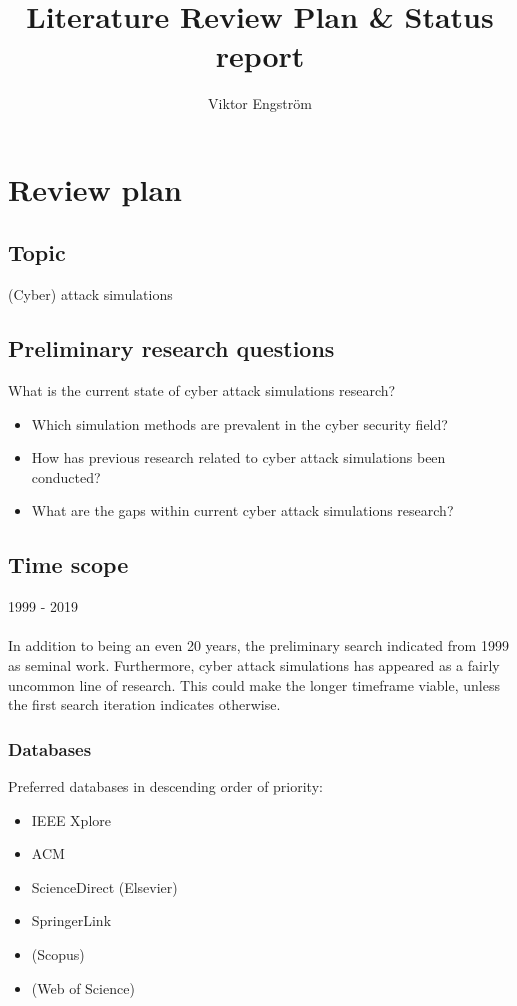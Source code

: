 \documentclass{article}
\title{Literature Review Plan \& Status report}
\author{Viktor Engström}
\begin{document}
\maketitle

\section{Review plan}
\subsection{Topic}
(Cyber) attack simulations

\subsection{Preliminary research questions}
What is the current state of cyber attack simulations research?
\begin{itemize}
    \item Which simulation methods are prevalent in the cyber security field?
    \item How has previous research related to cyber attack simulations been conducted?
    \item What are the gaps within current cyber attack simulations research?
\end{itemize}


\subsection{Time scope}
1999 - 2019\\
\\
\noindent In addition to being an even 20 years, the preliminary search indicated \cite{cohen1999} from 1999 as seminal work. Furthermore, cyber attack simulations has appeared as a fairly uncommon line of research. This could make the longer timeframe viable, unless the first search iteration indicates otherwise.


\subsubsection{Databases}
Preferred databases in descending order of priority:
\begin{itemize}
    \item IEEE Xplore
    \item ACM
    \item ScienceDirect (Elsevier)
    \item SpringerLink
    \item (Scopus)
    \item (Web of Science)
\end{itemize}
\end{document}
